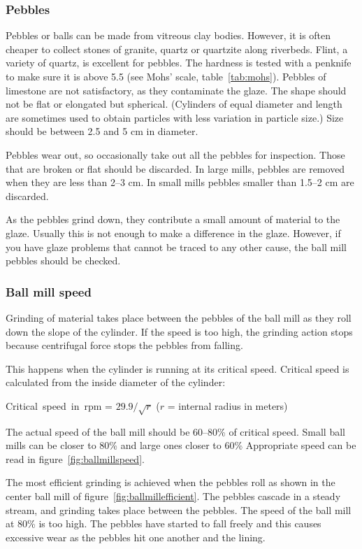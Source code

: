 \subsubsection{Pebbles}
Pebbles or balls can be made from vitreous clay bodies. However, it is often 
cheaper to collect stones of granite, quartz or quartzite along riverbeds. 
Flint, a variety of quartz, is excellent for pebbles. The hardness is tested 
with a penknife to make sure it is above 5.5 (see Mohs' scale, 
table~\ref{tab:mohs}). Pebbles of limestone are not satisfactory, as they 
contaminate the glaze. The shape should not be flat or elongated but spherical. 
(Cylinders of equal diameter and length are sometimes used to obtain particles 
with less variation in particle size.) Size should be between 2.5 and 5 cm in 
diameter.

Pebbles wear out, so occasionally take out all the pebbles for inspection. 
Those that are broken or flat should be discarded. In large mills, pebbles are 
removed when they are less than 2--3 cm. In small mills pebbles smaller than 
1.5--2 cm are discarded.

As the pebbles grind down, they contribute a small amount of material to the 
glaze. Usually this is not enough to make a difference in the glaze. However, 
if you have glaze problems that cannot be traced to any other cause, the ball 
mill pebbles should be checked.
\subsubsection{Ball mill speed}
Grinding of material takes place between the pebbles of the ball mill as they 
roll down the slope of the cylinder. If the speed is too high, the grinding 
action stops because centrifugal force stops the pebbles from falling.

This happens when the cylinder is running at its critical speed. Critical speed 
is calculated from the inside diameter of the cylinder:

Critical~speed~in~rpm = $29.9/\sqrt{r}$ ($r$ = internal radius in meters)

The actual speed of the ball mill should be 60--80\% of critical speed. Small 
ball mills can be closer to 80\% and large ones closer to 60\% Appropriate 
speed can be read in figure~\ref{fig:ballmillspeed}.

The most efficient grinding is achieved when the pebbles roll as shown in the 
center ball mill of figure~\ref{fig:ballmillefficient}. The pebbles cascade in 
a steady stream, and grinding takes place between the pebbles. The speed of the 
ball mill at 80\% is too high. The pebbles have started to fall freely and this 
causes excessive wear as the pebbles hit one another and the lining.

